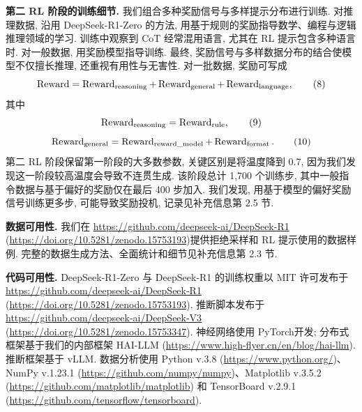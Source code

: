\noindent\textbf{第二 RL 阶段的训练细节.} 我们组合多种奖励信号与多样提示分布进行训练. 对推理数据, 沿用 DeepSeek-R1-Zero 的方法, 用基于规则的奖励指导数学、编程与逻辑推理领域的学习. 训练中观察到 CoT 经常混用语言, 尤其在 RL 提示包含多种语言时. 对一般数据, 用奖励模型指导训练. 最终, 奖励信号与多样数据分布的结合使模型不仅擅长推理, 还重视有用性与无害性. 对一批数据, 奖励可写成
\begin{equation}\label{r1n-eq8}
\operatorname{Reward}=\operatorname{Reward}_{\rm reasoning}
+\operatorname{Reward}_{\rm general}+\operatorname{Reward}_{\rm language},
\tag{8}
\end{equation}
其中
\begin{equation}\label{r1n-eq9}
\operatorname{Reward}_{\rm reasoning}=\operatorname{Reward}_{\rm rule},
\tag{9}
\end{equation}
\begin{equation}\label{r1n-eq10}
\operatorname{Reward}_{\rm general}
=\operatorname{Reward}_{\text{reward\_model}}+\operatorname{Reward}_{\rm format}.
\tag{10}
\end{equation}
第二 RL 阶段保留第一阶段的大多数参数, 关键区别是将温度降到 0.7, 因为我们发现这一阶段较高温度会导致不连贯生成. 该阶段总计 1,700 个训练步, 其中一般指令数据与基于偏好的奖励仅在最后 400 步加入. 我们发现, 用基于模型的偏好奖励信号训练更多步, 可能导致奖励投机, 记录见补充信息第 2.5 节.

\label{r1n-availability}
\noindent\textbf{数据可用性.} 我们在 \url{https://github.com/deepseek-ai/DeepSeek-R1} (\url{https://doi.org/10.5281/zenodo.15753193})\cite{r1n-ref33}提供拒绝采样和 RL 提示使用的数据样例. 完整的数据生成方法、全面统计和细节见补充信息第 2.3 节.

\noindent\textbf{代码可用性.} DeepSeek-R1-Zero 与 DeepSeek-R1 的训练权重以 MIT 许可发布于 \url{https://github.com/deepseek-ai/DeepSeek-R1} (\url{https://doi.org/10.5281/zenodo.15753193})\cite{r1n-ref33}. 推断脚本发布于 \url{https://github.com/deepseek-ai/DeepSeek-V3} (\url{https://doi.org/10.5281/zenodo.15753347})\cite{r1n-ref34}. 神经网络使用 PyTorch\cite{r1n-ref35}开发; 分布式框架基于我们的内部框架 HAI-LLM (\url{https://www.high-flyer.cn/en/blog/hai-llm}). 推断框架基于 vLLM\cite{r1n-ref36}. 数据分析使用 Python v.3.8 (\url{https://www.python.org/})、NumPy v.1.23.1 (\url{https://github.com/numpy/numpy})、Matplotlib v.3.5.2 (\url{https://github.com/matplotlib/matplotlib}) 和 TensorBoard v.2.9.1 (\url{https://github.com/tensorflow/tensorboard}).

